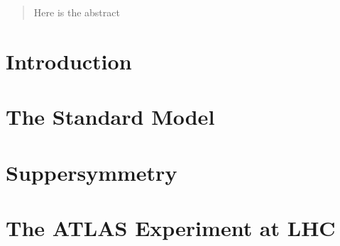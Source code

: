 \documentclass[hyperlinks]{outhesis}
\begin{document}
\begin{abstract}
Here is the abstract
\end{abstract}

\frontmatter

\maketitle

\mainmatter

\hypersetup{linkcolor=blue}


\chapter{Introduction}
\label{chapter:introduction}
\graphicspath{{figures/introduction/}}



\chapter{The Standard Model}
\label{chapter:standard_model}
\graphicspath{{figures/standard_model/}}



\chapter{Suppersymmetry}
\label{chapter:Suppersymmetry}
\graphicspath{{figures/suppersymmetry/}}



\chapter{The ATLAS Experiment at LHC}
\label{chapter:altas_experiment}
\graphicspath{{figures/atlas_experiment/}}



%


%
\end{document}
